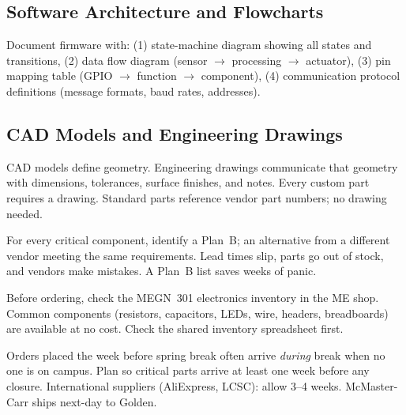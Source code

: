 \subsection{Software Architecture and Flowcharts}
Document firmware with: (1) state-machine diagram showing all states and transitions, (2) data flow diagram (sensor $\to$ processing $\to$ actuator), (3) pin mapping table (GPIO $\to$ function $\to$ component), (4) communication protocol definitions (message formats, baud rates, addresses).

\subsection{CAD Models and Engineering Drawings}
CAD models define geometry. Engineering drawings communicate that geometry with dimensions, tolerances, surface finishes, and notes. Every custom part requires a drawing. Standard parts reference vendor part numbers; no drawing needed.

\begin{tipbox}
For every critical component, identify a Plan~B; an alternative from a different vendor meeting the same requirements. Lead times slip, parts go out of stock, and vendors make mistakes. A Plan~B list saves weeks of panic.
\end{tipbox}

\begin{tipbox}
Before ordering, check the MEGN~301 electronics inventory in the ME shop. Common components (resistors, capacitors, LEDs, wire, headers, breadboards) are available at no cost. Check the shared inventory spreadsheet first.
\end{tipbox}

\begin{tipbox}
Orders placed the week before spring break often arrive \emph{during} break when no one is on campus. Plan so critical parts arrive at least one week before any closure. International suppliers (AliExpress, LCSC): allow 3--4 weeks. McMaster-Carr ships next-day to Golden.
\end{tipbox}

